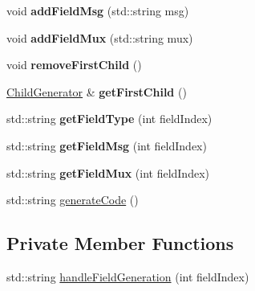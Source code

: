\begin{DoxyCompactItemize}
\item 
\hypertarget{classBottleCreatorGenerator_aea16ec13577f661086c30bd335ad58f2}{void {\bfseries add\-Field\-Msg} (std\-::string msg)}\label{classBottleCreatorGenerator_aea16ec13577f661086c30bd335ad58f2}

\item 
\hypertarget{classBottleCreatorGenerator_ac020e7913971161859f728e40f3dc253}{void {\bfseries add\-Field\-Mux} (std\-::string mux)}\label{classBottleCreatorGenerator_ac020e7913971161859f728e40f3dc253}

\item 
\hypertarget{classBottleCreatorGenerator_a328f92df32dcdc006008c19bfb1b4c25}{void {\bfseries remove\-First\-Child} ()}\label{classBottleCreatorGenerator_a328f92df32dcdc006008c19bfb1b4c25}

\item 
\hypertarget{classBottleCreatorGenerator_aec44a986041ce21c06f9c8540fcb667d}{\hyperlink{classChildGenerator}{Child\-Generator} \& {\bfseries get\-First\-Child} ()}\label{classBottleCreatorGenerator_aec44a986041ce21c06f9c8540fcb667d}

\item 
\hypertarget{classBottleCreatorGenerator_a862b67f6ea3ac4cf43f0b32feb44e682}{std\-::string {\bfseries get\-Field\-Type} (int field\-Index)}\label{classBottleCreatorGenerator_a862b67f6ea3ac4cf43f0b32feb44e682}

\item 
\hypertarget{classBottleCreatorGenerator_aa473bc54a236b2fe7016a640343396b1}{std\-::string {\bfseries get\-Field\-Msg} (int field\-Index)}\label{classBottleCreatorGenerator_aa473bc54a236b2fe7016a640343396b1}

\item 
\hypertarget{classBottleCreatorGenerator_a1090efb927fe566d4977a613f8221368}{std\-::string {\bfseries get\-Field\-Mux} (int field\-Index)}\label{classBottleCreatorGenerator_a1090efb927fe566d4977a613f8221368}

\item 
std\-::string \hyperlink{classBottleCreatorGenerator_a71d28a76d750bcfa2de6f62f8b9b5a62}{generate\-Code} ()
\end{DoxyCompactItemize}
\subsection*{Private Member Functions}
\begin{DoxyCompactItemize}
\item 
std\-::string \hyperlink{classBottleCreatorGenerator_a691d8b9a0bc0796c4253286db7e3f1ac}{handle\-Field\-Generation} (int field\-Index)
\end{DoxyCompactItemize}
